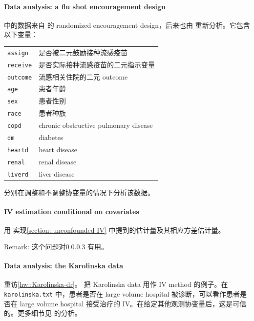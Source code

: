  
 


\paragraph{Data analysis: a flu shot encouragement design \citep{mcdonald1992effects}}\label{problem::flushot}
 

 中的数据来自 \citet{mcdonald1992effects} 的 randomized encouragement design，后来也由 \citet{hirano2000assessing} 重新分析。它包含以下变量：

\begin{tabular}{ll}
\hline 
\texttt{assign} & 是否被二元鼓励接种流感疫苗\\
\texttt{receive} & 是否实际接种流感疫苗的二元指示变量\\
\texttt{outcome} & 流感相关住院的二元 outcome\\
\texttt{age} & 患者年龄\\
\texttt{sex} & 患者性别\\
\texttt{race} & 患者种族\\
\texttt{copd} &  chronic obstructive pulmonary disease\\
\texttt{dm} & diabetes\\
\texttt{heartd} & heart disease\\
\texttt{renal} & renal disease\\
\texttt{liverd} & liver disease\\
\hline 
\end{tabular}


分别在调整和不调整协变量的情况下分析该数据。
 


\paragraph{IV estimation conditional on covariates}\label{hw::iv-conditional-x}

用  实现\cref{section::unconfounded-IV} 中提到的估计量及其相应方差估计量。

Remark: 这个问题对\cref{hw::analyze-karolinska-iv} 有用。



\paragraph{Data analysis: the Karolinska data}\label{hw::analyze-karolinska-iv}

重访\cref{hw::Karolinska-dr}。
\citet{rubin2008objective} 把 Karolinska data 用作 IV method 的例子。在 \texttt{karolinska.txt} 中，患者是否在 large volume hospital 被诊断，可以看作患者是否在 large volume hospital 接受治疗的 IV。在给定其他观测协变量后，这是可信的。更多细节见 \citet{rubin2008objective} 的分析。



